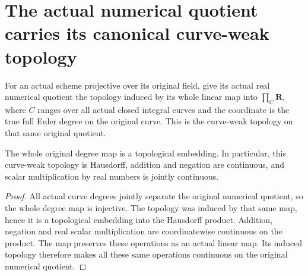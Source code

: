 \section{The actual numerical quotient carries its canonical curve-weak topology}
\label{sec:native-numerical-curve-topology}

\begin{definition}
\label{def:native-numerical-curve-weak-topology}
\leanok
{}
For an actual scheme projective over its original field, give its actual
real numerical quotient the topology induced by its whole linear map into
$\prod_C\mathbf R$, where $C$ ranges over all actual closed integral curves
and the coordinate is the true full Euler degree on the original curve.
This is the curve-weak topology on that same original quotient.
\end{definition}

\begin{theorem}
\label{thm:native-numerical-curve-weak-vector-topology}
\leanok
{}
The whole original degree map is a topological embedding. In particular,
this curve-weak topology is Hausdorff, addition and negation are continuous,
and scalar multiplication by real numbers is jointly continuous.
\end{theorem}
\begin{proof}
All actual curve degrees jointly separate the original numerical quotient,
so the whole degree map is injective. The topology was induced by that
same map, hence it is a topological embedding into the Hausdorff product.
Addition, negation and real scalar multiplication are coordinatewise
continuous on the product. The map preserves these operations as an actual
linear map. Its induced topology therefore makes all these same operations
continuous on the original numerical quotient.
\end{proof}

